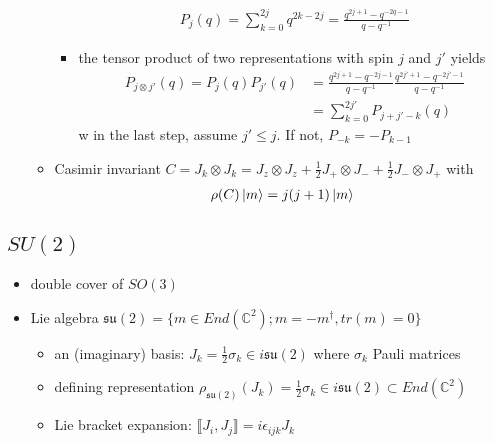 \documentclass[11pt]{article}
\begin{document}
\begin{itemize}
\begin{itemize}
\begin{itemize}
                \begin{align*}
                    P_j(q) = \sum_{k=0}^{2j} q^{2k-2j} = \frac{q^{2j+1}- q^{-2q-1}}{q-q^{-1}}
                \end{align*}
                \item the tensor product of two representations with spin $j$ and $j'$ yields 
                \begin{align*}
                    P_{j \otimes j'} (q) = P_j(q) P_{j'}(q) &= \frac{q^{2j+1} -q^{-2j-1} }{q - q^{-1}}\frac{q^{2j'+1} - q^{-2j' - 1}}{q - q^{-1}} \\
                    &= \sum_{k=0}^{2j'}P_{j+j'-k}(q) 
                \end{align*}w
                in the last step, assume $j' \leq j$. If not, $P_{-k} = -P_{k-1}$
            \end{itemize}
            \item Casimir invariant $C = J_k \otimes J_k = J_z \otimes J_z + \frac{1}{2}J_+ \otimes J_- + \frac{1}{2}J_- \otimes J_+$ with 
            \begin{align*}
                \rho(C) \ket{m} = j(j+1) \ket{m}
            \end{align*}
        \end{itemize}
\end{itemize}

\subsection{$SU(2)$}
\begin{itemize}
    \item double cover of $SO(3)$
    \item Lie algebra $\mathfrak{su}(2) = \{m \in End(\mathbb{C}^2); m = -m^\dagger, tr(m) = 0\}$ 
        \begin{itemize}
            \item an (imaginary) basis: $J_k = \frac{1}{2}\sigma_k \in i \mathfrak{su}(2)$ where $\sigma_k$ Pauli matrices
            \item defining representation $\rho_{\mathfrak{su}(2)} (J_k) = \frac{1}{2}\sigma_k \in i \mathfrak{su}(2) \subset End(\mathbb{C}^2)$
            \item Lie bracket expansion: $\llbracket J_i, J_j \rrbracket = i\epsilon_{ijk} J_k$ 
        \end{itemize}
\end{itemize}
\end{document}
